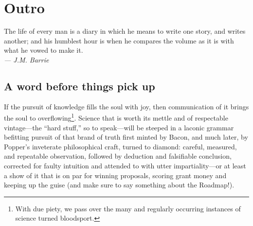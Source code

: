 
\chapter{Outro}
\label{chp:outro}

\begin{flushright}
\begin{minipage}[]{0.55\linewidth}
    \begin{flushright}
      The life of every man is a diary in which he means to write one story, and writes another; and his humblest hour is when he
      compares the volume as it is with what he vowed to make it. \\{\small \emph{--- J.M. Barrie} }
    \end{flushright}
\end{minipage}
\end{flushright}
\vspace{\baselineskip}

\section{A word before things pick up}

If the pursuit of knowledge fills the soul with joy, then
communication of it brings the soul to overflowing\footnote{With due
  piety, we pass over the many and regularly occurring instances of
  science turned bloodsport.}. Science that is worth its mettle and of
respectable vintage---the ``hard stuff,'' so to speak---will be
steeped in a laconic grammar befitting pursuit of that brand of truth
first minted by Bacon, and much later, by Popper's inveterate
philosophical craft, turned to diamond: careful, measured, and
repeatable observation, followed by deduction and falsifiable
conclusion, corrected for faulty intuition and attended to with utter
impartiality---or at least a show of it that is on par for winning
proposals, scoring grant money and keeping up the guise (and make sure
to say something about the Roadmap!).

